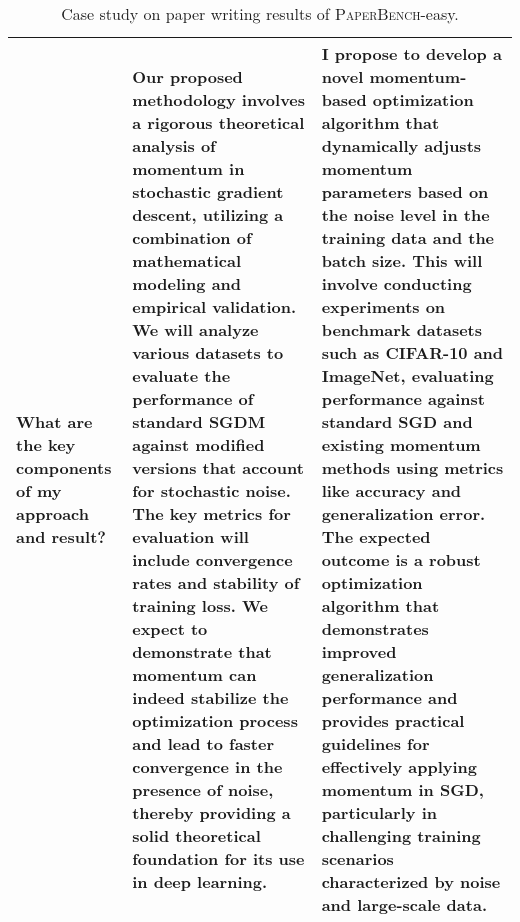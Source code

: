 \begin{table*}[htbp]
\begin{tabular}{p{3cm}p{6cm}p{6cm}}
What are the key components of my approach and result? & 
Our proposed methodology involves a rigorous theoretical analysis of momentum in stochastic gradient descent, utilizing a combination of mathematical modeling and empirical validation. We will analyze various datasets to evaluate the performance of standard SGDM against modified versions that account for stochastic noise. The key metrics for evaluation will include convergence rates and stability of training loss. We expect to demonstrate that momentum can indeed stabilize the optimization process and lead to faster convergence in the presence of noise, thereby providing a solid theoretical foundation for its use in deep learning. &
I propose to develop a novel momentum-based optimization algorithm that dynamically adjusts momentum parameters based on the noise level in the training data and the batch size. This will involve conducting experiments on benchmark datasets such as CIFAR-10 and ImageNet, evaluating performance against standard SGD and existing momentum methods using metrics like accuracy and generalization error. The expected outcome is a robust optimization algorithm that demonstrates improved generalization performance and provides practical guidelines for effectively applying momentum in SGD, particularly in challenging training scenarios characterized by noise and large-scale data.
\\
\bottomrule[1.1pt]
\end{tabular}
\caption{Case study on paper writing results of \textsc{PaperBench}-easy.}
\label{tab:paperbench easy}
\end{table*}


